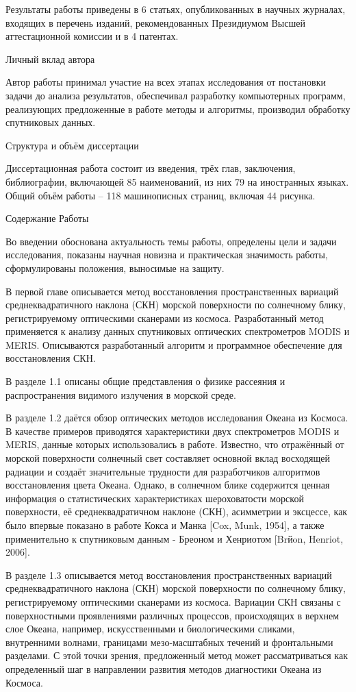Результаты работы приведены в 6 статьях, опубликованных в научных журналах, входящих в перечень изданий, рекомендованных Президиумом Высшей аттестационной комиссии и в 4 патентах.

 Личный вклад автора

Автор работы принимал участие на всех этапах исследования от постановки задачи до анализа результатов, обеспечивал разработку компьютерных программ, реализующих предложенные в работе методы и алгоритмы, производил обработку спутниковых данных. 

 Структура и объём диссертации

Диссертационная работа состоит из введения, трёх глав, заключения, библиографии, включающей 85 наименований, из них 79 на иностранных языках. Общий объём работы -- 118 машинописных страниц, включая 44 рисунка.



 Содержание Работы

Во введении обоснована актуальность темы работы, определены цели и задачи исследования, показаны научная новизна и практическая значимость работы, сформулированы положения, выносимые на защиту.

В первой главе описывается метод восстановления пространственных вариаций среднеквадратичного наклона (СКН) морской поверхности по солнечному блику, регистрируемому оптическими сканерами из космоса. Разработанный метод применяется к анализу данных спутниковых оптических спектрометров MODIS и MERIS. Описываются разработанный алгоритм и программное обеспечение для восстановления СКН.

В разделе 1.1 описаны общие представления о физике рассеяния и распространения видимого излучения в морской среде.

В разделе 1.2 даётся обзор оптических методов исследования Океана из Космоса. В качестве примеров приводятся характеристики двух спектрометров MODIS и MERIS, данные которых использовались в работе. Известно, что отражённый от морской поверхности солнечный свет составляет основной вклад восходящей радиации и создаёт значительные трудности для разработчиков алгоритмов восстановления цвета Океана. Однако, в солнечном блике содержится ценная информация о статистических характеристиках шероховатости морской поверхности, её среднеквадратичном наклоне (СКН), асимметрии и эксцессе, как было впервые показано в работе Кокса и Манка [Cox, Munk, 1954], а также применительно к спутниковым данным - Бреоном и Хенриотом [Brйon, Henriot, 2006]. 

В разделе 1.3 описывается метод восстановления пространственных вариаций среднеквадратичного наклона (СКН) морской поверхности по солнечному блику, регистрируемому оптическими сканерами из космоса. Вариации СКН связаны с поверхностными проявлениями различных процессов, происходящих в верхнем слое Океана, например, искусственными и биологическими сликами, внутренними волнами, границами мезо-масштабных течений и фронтальными разделами. С этой точки зрения, предложенный метод может рассматриваться как определенный шаг в направлении развития методов диагностики Океана из Космоса.


